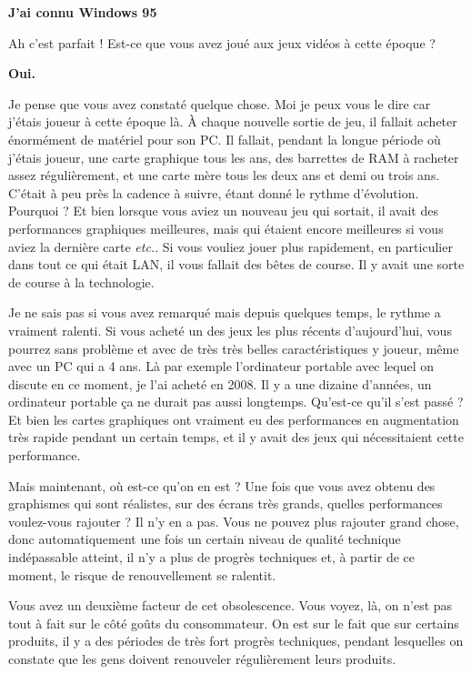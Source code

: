 \begin{small}
\smallbreak\textbf{J'ai connu Windows 95}
\smallbreak

Ah c'est parfait ! Est-ce que vous avez joué aux jeux vidéos à cette époque ? 


\smallbreak\textbf{Oui.}\smallbreak

Je pense que vous avez constaté quelque chose. Moi je peux vous le dire car j'étais joueur à cette époque là.  À chaque nouvelle sortie de jeu, il fallait acheter énormément de matériel pour son PC. Il fallait, pendant la longue période où j'étais joueur, une carte graphique tous les ans, des barrettes de RAM à racheter assez régulièrement, et une carte mère tous les deux ans et demi ou trois ans. C'était à peu près la cadence à suivre, étant donné le rythme d'évolution. Pourquoi ? Et bien lorsque vous aviez un nouveau jeu qui sortait, il avait des performances graphiques meilleures, mais qui étaient encore meilleures si vous aviez la dernière carte \textit{etc.}.  
Si vous vouliez  jouer plus rapidement, en particulier dans tout ce qui était LAN, il vous fallait des bêtes de course. Il y avait une sorte de course à la technologie. 

Je ne sais pas si vous avez remarqué mais depuis quelques temps, le rythme a vraiment ralenti. Si vous acheté un des jeux les plus récents d'aujourd'hui, vous pourrez sans problème et avec de très très belles caractéristiques y joueur, même avec un PC qui a 4 ans. 
Là par exemple l'ordinateur portable avec lequel on discute en ce moment, je l'ai acheté en 2008. Il y a une dizaine d'années, un ordinateur portable ça ne durait pas aussi longtemps. Qu'est-ce qu'il s'est passé ? Et bien les cartes graphiques ont  vraiment eu des performances en augmentation très rapide pendant un certain temps,  et il y avait des jeux qui nécessitaient cette performance.

 Mais maintenant, où est-ce qu'on en est ? Une fois que vous avez obtenu des graphismes qui sont réalistes, sur des écrans très grands, quelles performances voulez-vous rajouter ? Il n'y en a pas. Vous ne pouvez plus rajouter grand chose, donc automatiquement une fois un certain niveau de qualité technique indépassable atteint, il n'y a plus de progrès techniques et, à partir de ce moment, le risque de renouvellement se ralentit. 
 \smallbreak
 
 Vous avez un deuxième facteur de cet obsolescence. Vous voyez, là, on n'est pas tout à fait sur le côté \og goûts du consommateur\fg{}. On est sur le fait que sur certains produits, il y a des périodes de très fort progrès techniques, pendant lesquelles on constate que les gens doivent renouveler régulièrement leurs produits. 
 

\end{small}
